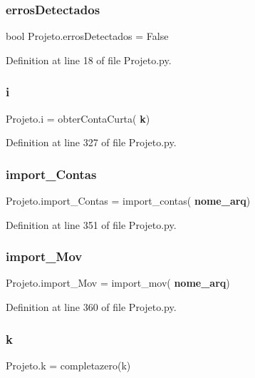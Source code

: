 \subsubsection{errosDetectados}
{\footnotesize\ttfamily bool Projeto.\+erros\+Detectados = False}



Definition at line 18 of file Projeto.\+py.

\mbox{\label{namespace_projeto_a1ec645113741ea544a6c57676694a906}} 
\subsubsection{i}
{\footnotesize\ttfamily Projeto.\+i = obter\+Conta\+Curta(\textbf{ k})}



Definition at line 327 of file Projeto.\+py.

\mbox{\label{namespace_projeto_ab75dd6f236c6f049a30677f406c98978}} 
\subsubsection{import\_Contas}
{\footnotesize\ttfamily Projeto.\+import\+\_\+\+Contas = import\+\_\+contas(\textbf{ nome\+\_\+arq})}



Definition at line 351 of file Projeto.\+py.

\mbox{\label{namespace_projeto_a35ff6f9def607edd595d8890704710c5}} 
\subsubsection{import\_Mov}
{\footnotesize\ttfamily Projeto.\+import\+\_\+\+Mov = import\+\_\+mov(\textbf{ nome\+\_\+arq})}



Definition at line 360 of file Projeto.\+py.

\mbox{\label{namespace_projeto_a65ae2f97c6fd29621f1e0bfa8036e088}} 
\subsubsection{k}
{\footnotesize\ttfamily Projeto.\+k = completazero(k)}



